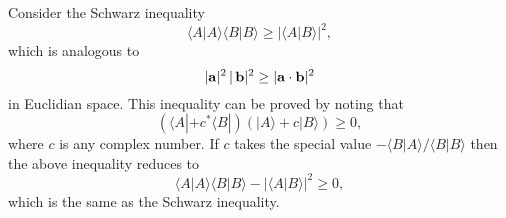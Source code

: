 Consider the Schwarz inequality
\begin{equation}
\langle A|A\rangle \langle B|B\rangle \geq |\langle A|B\rangle|^2,
\end{equation}
which is analogous to
\begin{equation}
|{\bf a}|^2 \,|\,{\bf b}|^2 \geq |{\bf a}\cdot {\bf b}|^2
\end{equation}
in Euclidian space. This inequality can be proved by noting that
\begin{equation}
(\langle A| + c^\ast \langle B|) (|A\rangle + c |B\rangle) \geq 0,
\end{equation}
where $c$ is any  complex number. If $c$ takes the special value
$-\langle B|A\rangle/\langle B|B\rangle$ then the above inequality reduces to
\begin{equation}
\langle A|A\rangle \langle B|B\rangle - |\langle A|B\rangle|^2 \geq 0,
\end{equation}
which is the same as the Schwarz inequality. 

